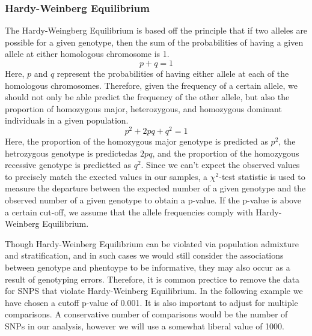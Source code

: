 \documentclass[11pt]{article}\usepackage[]{graphicx}\usepackage[]{color}
\begin{document}
\subsubsection*{Hardy-Weinberg Equilibrium}
The Hardy-Weingberg Equilibrium is based off the principle that if two alleles are possible for a given genotype, then the sum of the probabilities of having a given allele at either homologous chromosome is 1.
$$p+q=1$$
Here, $p$ and $q$ represent the probabilities of having either allele at each of the homologous chromosomes.
Therefore, given the frequency of a certain allele, we should not only be able predict the frequency of the other allele, but also the proportion of homozygous major, heterozygous, and homozygous dominant individuals in a given population.
$$p^2 +2pq+q^2=1$$
Here, the proportion of the homozygous major genotype is predicted as $p^2$, the hetrozygous genotype is predictedas $2pq$, and the proportion of the homozygous recessive genotype  is predictted as $q^2$. Since we can't expect the observed values to precisely match the exected values in our samples, a $\chi^2$-test statistic is used to measure the departure between the expected number of a given genotype and the observed number of a given genotype to obtain a p-value.  If the p-value is above a certain cut-off, we assume that the allele frequencies comply with Hardy-Weinberg Equilibrium. 

Though Hardy-Weinberg Equilibrium can be violated via population admixture and stratification, and in such cases we would still consider the associations between genotype and phentoype to be informative, they may also occur as a result of genotyping errors.  Therefore, it is common prectice to remove the data for SNPS that violate Hardy-Weinberg Equilibrium. In the following example we have chosen a cutoff p-value of 0.001.
It is also important to adjust for multiple comparisons. A conservative number of comparisons would be the number of SNPs in our analysis, however we will use a somewhat liberal value of 1000.
\end{document}

